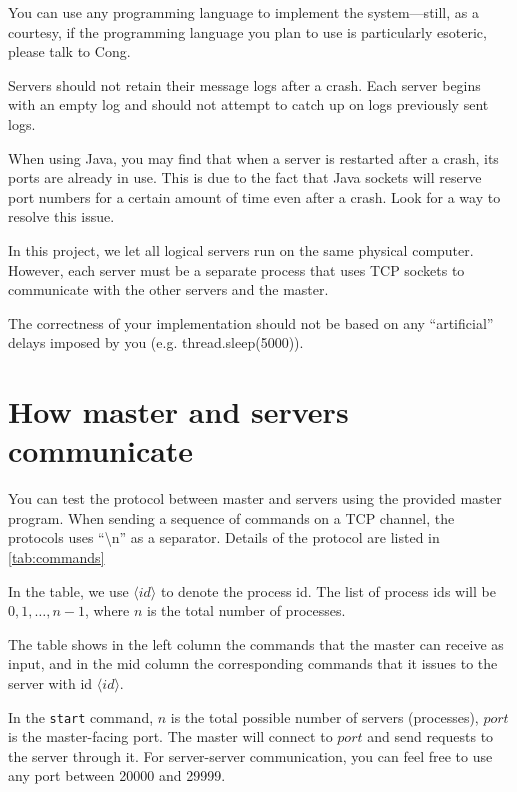 \documentclass[11pt]{article}
\begin{document}
	\begin{compactitem}
		\item You can use any programming language to implement the system---still, as a courtesy, if the programming language you plan to use is particularly esoteric, please talk to Cong. 
		\item Servers should not retain their message logs after a crash. Each server begins with an empty log and should not attempt to catch up on logs previously sent logs.
		\item When using Java, you may find that when a server is restarted after a crash, its ports are already in use. This is due to the fact that Java sockets will reserve port numbers for a certain amount of time even after a crash. Look for a way to resolve this issue.
		\item In this project, we let all logical servers run on the same physical 
		computer. However, each server must be a separate process that uses TCP sockets to communicate with the other servers and the master.
		\item The correctness of your implementation should not be based on any ``artificial'' delays imposed by you (e.g. thread.sleep(5000)).
	\end{compactitem}
	
	\section{How master and servers communicate}
	You can test the protocol between master and servers  using the provided master program. When sending a sequence of commands on a TCP channel, the protocols uses ``\textbackslash n'' as a separator. Details of the protocol are listed in \autoref{tab:commands}
	
	In the table, we use $\langle id\rangle$ to denote the process id. The list of process ids will be	$0,1,\dots,n-1$, where $n$ is the total number of processes. 
	
	The table shows in the left column the commands that the master can receive as  input, and in the mid column the corresponding commands that it issues to the server with id $\langle id\rangle$.
	
	In the \texttt{start} command, $n$ is the total possible number of servers
	(processes), $port$ is the master-facing port. The master will connect to $port$ and send requests to the server through it.	For server-server communication, you can feel free to use any port between 20000 and 29999.
		
\end{document}
